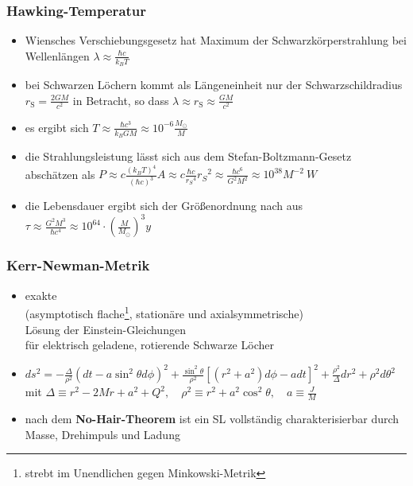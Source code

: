 \documentclass{beamer}
\begin{document}
\begin{frame}\frametitle{Hawking-Temperatur}

\begin{itemize}

\item Wiensches Verschiebungsgesetz hat Maximum der Schwarzkörperstrahlung bei Wellenlängen $\lambda \approx \frac {\hbar c}{k_B T}$
\item bei Schwarzen Löchern kommt als Längeneinheit nur der Schwarzschildradius $r_\mathrm{S} = \frac{2 G M}{c^2}$ in Betracht, so dass  $\lambda \approx r_\mathrm{S}\approx  \frac{G M}{c^2}$
\item es ergibt sich $T \approx \frac {\hbar c^3}{k_B G M} \approx 10^{-6} \frac {M_{\odot}}{M}$

\item die Strahlungsleistung lässt sich aus dem Stefan-Boltzmann-Gesetz abschätzen als
$P \approx c \frac {{(k_B T)}^4}{{{(\hbar c)}}^3} A \approx c  \frac {\hbar c}{{r_S}^4} {r_S}^2 \approx \frac {\hbar c^6}{G^2 M^2} \approx 10^{38} M^{-2} \ W$

\item die Lebensdauer ergibt sich der Größenordnung nach aus $\tau \approx \frac {G^2 M^3}{\hbar c^4} \approx 10^{64} \cdot \left(\frac {M}{M_{\odot}} \right)^3 y$

\end{itemize}

\end{frame}

\begin{frame}\frametitle{Kerr-Newman-Metrik}

\begin{itemize}
\item exakte \\ (asymptotisch flache\footnote{strebt im Unendlichen gegen Minkowski-Metrik}, stationäre und axialsymmetrische) \\ Lösung der Einstein-Gleichungen \\ für elektrisch geladene, rotierende Schwarze Löcher \vspace{.1cm}
\item \tiny $ds^{2}=-\frac{\Delta}{\rho^{2}}\left(dt-a\sin^{2}\theta d\phi\right)^{2}+\frac{\sin^{2}\theta}{\rho^{2}}\left[\left(r^{2}+a^{2}\right)d\phi-{a}dt\right]^{2}
+\frac{\rho^{2}}{\Delta}dr^{2}+\rho^{2}d\theta^{2}$\\
\small mit
$\Delta\equiv r^{2}-2Mr+a^{2}+Q^{2}, \quad \rho^{2}\equiv r^{2}+a^{2}\cos^{2}\theta, \quad a\equiv\frac{J}{M}$ \vspace{.1cm}
\item nach dem \textbf{No-Hair-Theorem} ist ein SL vollständig charakterisierbar durch Masse, Drehimpuls und Ladung
\end{itemize}

\end{frame}
\end{document}
